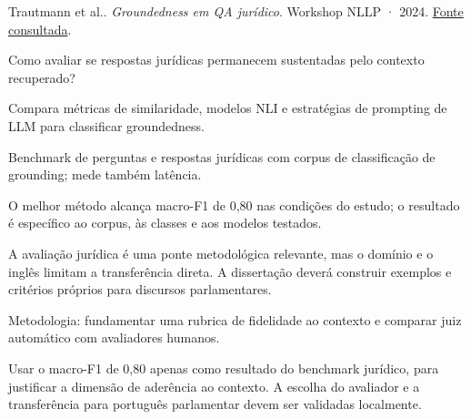 {\small Trautmann et al.. \textit{Groundedness em QA jurídico}. Workshop NLLP · 2024. \href{https://aclanthology.org/2024.nllp-1.14/}{Fonte consultada}.\par}

Como avaliar se respostas jurídicas permanecem sustentadas pelo contexto recuperado?

Compara métricas de similaridade, modelos NLI e estratégias de prompting de LLM para classificar groundedness.

Benchmark de perguntas e respostas jurídicas com corpus de classificação de grounding; mede também latência.

O melhor método alcança macro-F1 de 0,80 nas condições do estudo; o resultado é específico ao corpus, às classes e aos modelos testados.

\begin{itemize}
\end{itemize}

A avaliação jurídica é uma ponte metodológica relevante, mas o domínio e o inglês limitam a transferência direta. A dissertação deverá construir exemplos e critérios próprios para discursos parlamentares.

Metodologia: fundamentar uma rubrica de fidelidade ao contexto e comparar juiz automático com avaliadores humanos.

Usar o macro-F1 de 0,80 apenas como resultado do benchmark jurídico, para justificar a dimensão de aderência ao contexto. A escolha do avaliador e a transferência para português parlamentar devem ser validadas localmente.

